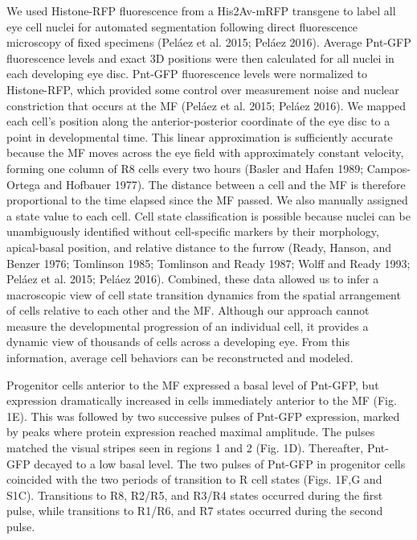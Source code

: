 We used Histone-RFP fluorescence from a His2Av-mRFP transgene to label all eye cell nuclei for automated segmentation following direct fluorescence microscopy of fixed specimens (Peláez et al. 2015; Peláez 2016). Average Pnt-GFP fluorescence levels and exact 3D positions were then calculated for all nuclei in each developing eye disc. Pnt-GFP fluorescence levels were normalized to Histone-RFP, which provided some control over measurement noise and nuclear constriction that occurs at the MF (Peláez et al. 2015; Peláez 2016). We mapped each cell's position along the anterior-posterior coordinate of the eye disc to a point in developmental time. This linear approximation is sufficiently accurate because the MF moves across the eye field with approximately constant velocity, forming one column of R8 cells every two hours (Basler and Hafen 1989; Campos-Ortega and Hofbauer 1977). The distance between a cell and the MF is therefore proportional to the time elapsed since the MF passed. We also manually assigned a state value to each cell. Cell state classification is possible because nuclei can be unambiguously identified without cell-specific markers by their morphology, apical-basal position, and relative distance to the furrow (Ready, Hanson, and Benzer 1976; Tomlinson 1985; Tomlinson and Ready 1987; Wolff and Ready 1993; Peláez et al. 2015; Peláez 2016). Combined, these data allowed us to infer a macroscopic view of cell state transition dynamics from the spatial arrangement of cells relative to each other and the MF. Although our approach cannot measure the developmental progression of an individual cell, it provides a dynamic view of thousands of cells across a developing eye. From this information, average cell behaviors can be reconstructed and modeled.

Progenitor cells anterior to the MF expressed a basal level of Pnt-GFP, but expression dramatically increased in cells immediately anterior to the MF (Fig. 1E). This was followed by two successive pulses of Pnt-GFP expression, marked by peaks where protein expression reached maximal amplitude. The pulses matched the visual stripes seen in regions 1 and 2 (Fig. 1D). Thereafter, Pnt-GFP decayed to a low basal level. The two pulses of Pnt-GFP in progenitor cells coincided with the two periods of transition to R cell states (Figs. 1F,G and S1C). Transitions to R8, R2/R5, and R3/R4 states occurred during the first pulse, while transitions to R1/R6, and R7 states occurred during the second pulse.

